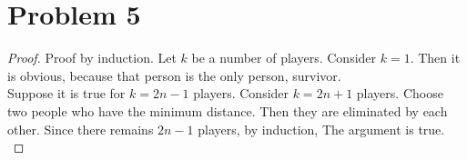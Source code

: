 \section*{Problem 5}
\begin{proof}
	Proof by induction. Let $k$ be a number of players. Consider $k = 1$. Then it is obvious, because that person is the only person, survivor.\\
	Suppose it is true for $k = 2n - 1$ players. Consider $k = 2n + 1$ players. Choose two people who have the minimum distance. Then they are eliminated by each other. Since there remains $2n - 1$ players, by induction, The argument is true.\\
\end{proof}